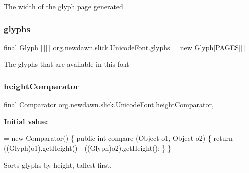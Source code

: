 The width of the glyph page generated \mbox{\label{classorg_1_1newdawn_1_1slick_1_1_unicode_font_a7c13214f4b7f734a81731b1d4e82449a}} 
\subsubsection{\texorpdfstring{glyphs}{glyphs}}
{\footnotesize\ttfamily final \mbox{\hyperlink{classorg_1_1newdawn_1_1slick_1_1font_1_1_glyph}{Glyph}} \mbox{[}$\,$\mbox{]}\mbox{[}$\,$\mbox{]} org.\+newdawn.\+slick.\+Unicode\+Font.\+glyphs = new \mbox{\hyperlink{classorg_1_1newdawn_1_1slick_1_1font_1_1_glyph}{Glyph}}\mbox{[}\mbox{\hyperlink{classorg_1_1newdawn_1_1slick_1_1_unicode_font_a2f1bf2ab8649b6db562d35e9c2fa1bcd}{P\+A\+G\+ES}}\mbox{]}\mbox{[}$\,$\mbox{]}\hspace{0.3cm}{\ttfamily [private]}}

The glyphs that are available in this font \mbox{\label{classorg_1_1newdawn_1_1slick_1_1_unicode_font_a45941677f56ea53fdc25e7d20f6cd32f}} 
\subsubsection{\texorpdfstring{height\+Comparator}{heightComparator}}
{\footnotesize\ttfamily final Comparator org.\+newdawn.\+slick.\+Unicode\+Font.\+height\+Comparator\hspace{0.3cm}{\ttfamily [static]}, {\ttfamily [private]}}

{\bfseries Initial value\+:}
\begin{DoxyCode}
= \textcolor{keyword}{new} Comparator() \{
        \textcolor{keyword}{public} \textcolor{keywordtype}{int} compare (Object o1, Object o2) \{
            \textcolor{keywordflow}{return} ((Glyph)o1).getHeight() - ((Glyph)o2).getHeight();
        \}
    \}
\end{DoxyCode}
Sorts glyphs by height, tallest first. \mbox{\label{classorg_1_1newdawn_1_1slick_1_1_unicode_font_a2288222beb428489eccae8d71f278e37}} 
